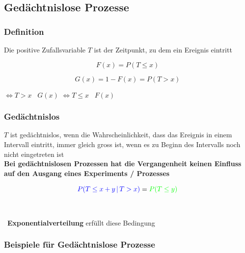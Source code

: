 

\subsection{Gedächtnislose Prozesse}

\subsubsection{Definition}

Die positive Zufallsvariable $T$ ist der Zeitpunkt, zu dem ein Ereignis eintritt

\vspace{0.2cm}

\begin{minipage}{0.38\columnwidth}
	$$ \boxed{ F(x) = P( T \leq x ) } $$
\end{minipage}
\hfill
\begin{minipage}{0.58\columnwidth}
	$$ \boxed{ G(x) = 1 - F(x) = P(T > x) } $$
\end{minipage}

\vspace{0.2cm}
 $\Leftrightarrow T > x$ \textrightarrow\ $G(x)$
\qquad {} $\Leftrightarrow T \leq x$ \textrightarrow\ $F(x)$


\subsubsection{Gedächtnislos}

$T$ ist gedächtnislos, wenn die Wahrscheinlichkeit, dass das Ereignis in einem Intervall eintritt, immer gleich gross ist, 
wenn es zu Beginn des Intervalls noch nicht eingetreten ist \\
\textbf{Bei gedächtnislosen Prozessen hat die Vergangenheit keinen Einfluss auf den Ausgang eines Experiments / Prozesses }

$$ {\color{blue}P(T \leq x+y \, | \, T > x)} = {\color{green}P(T \leq y)} $$

 \\

\vspace{0.1cm}

\textrightarrow\ \textbf{Exponentialverteilung} erfüllt diese Bedingung


\subsubsection{Beispiele für Gedächtnislose Prozesse}

